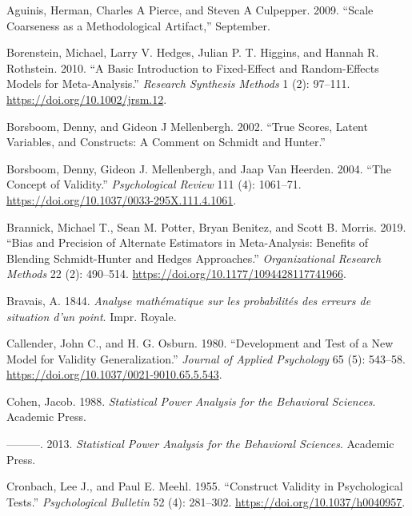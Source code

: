 \documentclass[
  letterpaper,
  DIV=11,
  numbers=noendperiod]{scrreprt}
\newlength{\cslhangindent}
\newlength{\cslentryspacingunit} %
\newenvironment{CSLReferences}[2] %
 {%
  \setlength{\parindent}{0pt}
  \ifodd #1
  \let\oldpar\par
  \def\par{\hangindent=\cslhangindent\oldpar}
  \fi
  \setlength{\parskip}{#2\cslentryspacingunit}
 }%
 {}
\begin{document}
\hypertarget{refs}{}
\begin{CSLReferences}{1}{0}
\leavevmode{}%
Aguinis, Herman, Charles A Pierce, and Steven A Culpepper. 2009.
{``Scale Coarseness as a Methodological Artifact,''} September.

\leavevmode{}%
Borenstein, Michael, Larry V. Hedges, Julian P. T. Higgins, and Hannah
R. Rothstein. 2010. {``A Basic Introduction to Fixed-Effect and
Random-Effects Models for Meta-Analysis.''} \emph{Research Synthesis
Methods} 1 (2): 97--111. \url{https://doi.org/10.1002/jrsm.12}.

\leavevmode{}%
Borsboom, Denny, and Gideon J Mellenbergh. 2002. {``True Scores, Latent
Variables, and Constructs: A Comment on Schmidt and Hunter.''}

\leavevmode{}%
Borsboom, Denny, Gideon J. Mellenbergh, and Jaap Van Heerden. 2004.
{``The Concept of Validity.''} \emph{Psychological Review} 111 (4):
1061--71. \url{https://doi.org/10.1037/0033-295X.111.4.1061}.

\leavevmode{}%
Brannick, Michael T., Sean M. Potter, Bryan Benitez, and Scott B.
Morris. 2019. {``Bias and Precision of Alternate Estimators in
Meta-Analysis: Benefits of Blending Schmidt-Hunter and Hedges
Approaches.''} \emph{Organizational Research Methods} 22 (2): 490--514.
\url{https://doi.org/10.1177/1094428117741966}.

\leavevmode{}%
Bravais, A. 1844. \emph{Analyse mathématique sur les probabilités des
erreurs de situation d'un point}. Impr. Royale.

\leavevmode{}%
Callender, John C., and H. G. Osburn. 1980. {``Development and Test of a
New Model for Validity Generalization.''} \emph{Journal of Applied
Psychology} 65 (5): 543--58.
\url{https://doi.org/10.1037/0021-9010.65.5.543}.

\leavevmode{}%
Cohen, Jacob. 1988. \emph{Statistical Power Analysis for the Behavioral
Sciences}. Academic Press.

\leavevmode{}%
---------. 2013. \emph{Statistical Power Analysis for the Behavioral
Sciences}. Academic Press.

\leavevmode{}%
Cronbach, Lee J., and Paul E. Meehl. 1955. {``Construct Validity in
Psychological Tests.''} \emph{Psychological Bulletin} 52 (4): 281--302.
\url{https://doi.org/10.1037/h0040957}.


\end{CSLReferences}
\end{document}
